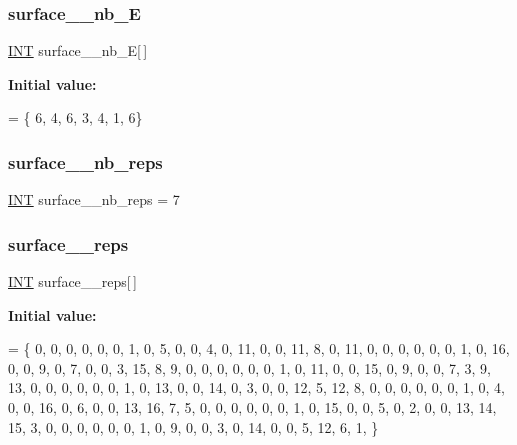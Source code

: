 \subsubsection{\texorpdfstring{surface\+\_\+\_\+nb\+\_\+E}{surface\_17\_nb\_E}}
{\footnotesize\ttfamily \mbox{\hyperlink{galois_8h_a09fddde158a3a20bd2dcadb609de11dc}{I\+NT}} surface\+\_\+\_\+nb\+\_\+E\mbox{[}$\,$\mbox{]}}

{\bfseries Initial value\+:}
\begin{DoxyCode}
= \{ 
    6, 4, 6, 3, 4, 1, 6\}
\end{DoxyCode}
\mbox{\label{surface__17_8_c_afd649f13ef06aaad5d31151a1cb57079}} 
\subsubsection{\texorpdfstring{surface\+\_\+\_\+nb\+\_\+reps}{surface\_17\_nb\_reps}}
{\footnotesize\ttfamily \mbox{\hyperlink{galois_8h_a09fddde158a3a20bd2dcadb609de11dc}{I\+NT}} surface\+\_\+\_\+nb\+\_\+reps = 7}

\mbox{\label{surface__17_8_c_a536bb1e15148d0564a3b3fd4e1e3e0ea}} 
\subsubsection{\texorpdfstring{surface\+\_\+\_\+reps}{surface\_17\_reps}}
{\footnotesize\ttfamily \mbox{\hyperlink{galois_8h_a09fddde158a3a20bd2dcadb609de11dc}{I\+NT}} surface\+\_\+\_\+reps\mbox{[}$\,$\mbox{]}}

{\bfseries Initial value\+:}
\begin{DoxyCode}
= \{
    0, 0, 0, 0, 0, 0, 1, 0, 5, 0, 0, 4, 0, 11, 0, 0, 11, 8, 0, 11, 
    0, 0, 0, 0, 0, 0, 1, 0, 16, 0, 0, 9, 0, 7, 0, 0, 3, 15, 8, 9, 
    0, 0, 0, 0, 0, 0, 1, 0, 11, 0, 0, 15, 0, 9, 0, 0, 7, 3, 9, 13, 
    0, 0, 0, 0, 0, 0, 1, 0, 13, 0, 0, 14, 0, 3, 0, 0, 12, 5, 12, 8, 
    0, 0, 0, 0, 0, 0, 1, 0, 4, 0, 0, 16, 0, 6, 0, 0, 13, 16, 7, 5, 
    0, 0, 0, 0, 0, 0, 1, 0, 15, 0, 0, 5, 0, 2, 0, 0, 13, 14, 15, 3, 
    0, 0, 0, 0, 0, 0, 1, 0, 9, 0, 0, 3, 0, 14, 0, 0, 5, 12, 6, 1, 
\}
\end{DoxyCode}
\mbox{\label{surface__17_8_c_a3b73ecf497758fc79995205bcfc46732}} 
